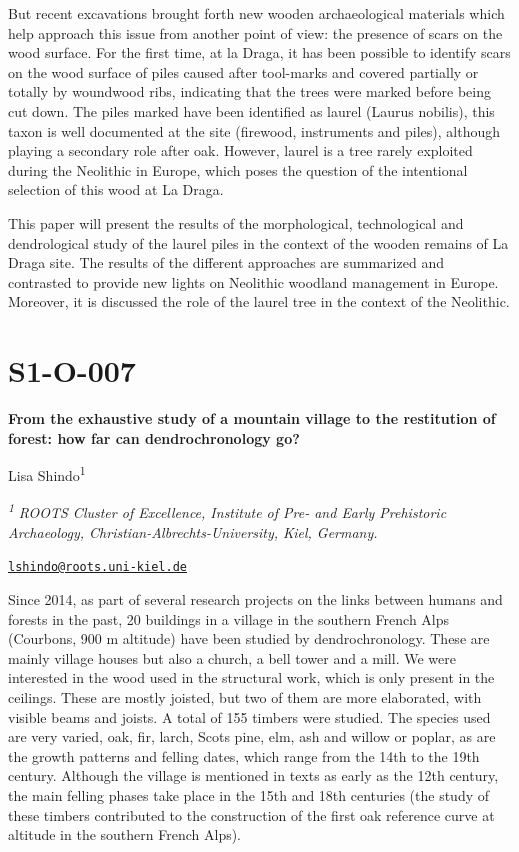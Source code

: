 \documentclass[
]{book}
\begin{document}
But recent excavations brought forth new wooden archaeological materials which help approach this issue from another point of view: the presence of scars on the wood surface. For the first time, at la Draga, it has been possible to identify scars on the wood surface of piles caused after tool-marks and covered partially or totally by woundwood ribs, indicating that the trees were marked before being cut down. The piles marked have been identified as laurel (Laurus nobilis), this taxon is well documented at the site (firewood, instruments and piles), although playing a secondary role after oak. However, laurel is a tree rarely exploited during the Neolithic in Europe, which poses the question of the intentional selection of this wood at La Draga.

This paper will present the results of the morphological, technological and dendrological study of the laurel piles in the context of the wooden remains of La Draga site. The results of the different approaches are summarized and contrasted to provide new lights on Neolithic woodland management in Europe. Moreover, it is discussed the role of the laurel tree in the context of the Neolithic.

\hypertarget{s1-o-007}{%
\section*{S1-O-007}\label{s1-o-007}}

\textbf{From the exhaustive study of a mountain village to the restitution of forest: how far can dendrochronology go?}

Lisa Shindo\textsuperscript{1}

\textsuperscript{\emph{1}} \emph{ROOTS Cluster of Excellence, Institute of Pre- and Early Prehistoric Archaeology, Christian-Albrechts-University, Kiel, Germany.}

\href{mailto:lshindo@roots.uni-kiel.de}{\nolinkurl{lshindo@roots.uni-kiel.de}}

Since 2014, as part of several research projects on the links between humans and forests in the past, 20 buildings in a village in the southern French Alps (Courbons, 900 m altitude) have been studied by dendrochronology. These are mainly village houses but also a church, a bell tower and a mill. We were interested in the wood used in the structural work, which is only present in the ceilings. These are mostly joisted, but two of them are more elaborated, with visible beams and joists. A total of 155 timbers were studied. The species used are very varied, oak, fir, larch, Scots pine, elm, ash and willow or poplar, as are the growth patterns and felling dates, which range from the 14th to the 19th century. Although the village is mentioned in texts as early as the 12th century, the main felling phases take place in the 15th and 18th centuries (the study of these timbers contributed to the construction of the first oak reference curve at altitude in the southern French Alps).
\end{document}
